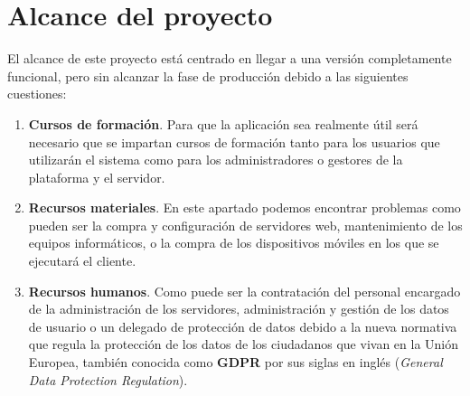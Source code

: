 \section{Alcance del proyecto}

El alcance de este proyecto está centrado en llegar a una versión completamente funcional,
pero sin alcanzar la fase de producción debido a las siguientes cuestiones:

\begin{enumerate}
    \item \textbf{Cursos de formación}. Para que la aplicación sea realmente útil será necesario
    que se impartan cursos de formación tanto para los usuarios que utilizarán el sistema
    como para los administradores o gestores de la plataforma y el servidor.

    \item \textbf{Recursos materiales}. En este apartado podemos encontrar problemas como pueden
    ser la compra y configuración de servidores web, mantenimiento de los equipos informáticos, o la 
    compra de los dispositivos móviles en los que se ejecutará el cliente.
    
    \item \textbf{Recursos humanos}. Como puede ser la contratación del personal encargado
    de la administración de los servidores, administración y gestión de los datos de usuario o un delegado de protección de datos debido a la nueva normativa que regula la protección de los datos de los ciudadanos que vivan en la Unión Europea, también conocida como \textbf{GDPR}\cite{gdpr} por sus siglas en inglés (\textit{General Data Protection Regulation}).

\end{enumerate}
